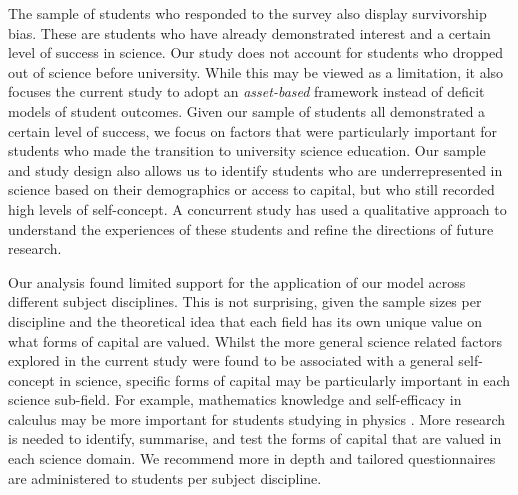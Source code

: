 The sample of students who responded to the survey also display survivorship bias. These are students who have already demonstrated interest and a certain level of success in science. Our study does not account for students who dropped out of science before university. While this may be viewed as a limitation, it also focuses the current study to adopt an \textit{asset-based} framework instead of deficit models of student outcomes. Given our sample of students all demonstrated a certain level of success, we focus on factors that were particularly important for students who made the transition to university science education. Our sample and study design also allows us to identify students who are underrepresented in science based on their demographics or access to capital, but who still recorded high levels of self-concept. A concurrent study has used a qualitative approach to understand the experiences of these students and refine the directions of future research.

Our analysis found limited support for the application of our model across different subject disciplines. This is not surprising, given the sample sizes per discipline and the theoretical idea that each field has its own unique value on what forms of capital are valued. Whilst the more general science related factors explored in the current study were found to be associated with a general self-concept in science, specific forms of capital may be particularly important in each science sub-field. For example, mathematics knowledge and self-efficacy in calculus may be more important for students studying in physics \cite{Black2016, Ellis_2016}. More research is needed to identify, summarise, and test the forms of capital that are valued in each science domain. We recommend more in depth and tailored questionnaires are administered to students per subject discipline.  

